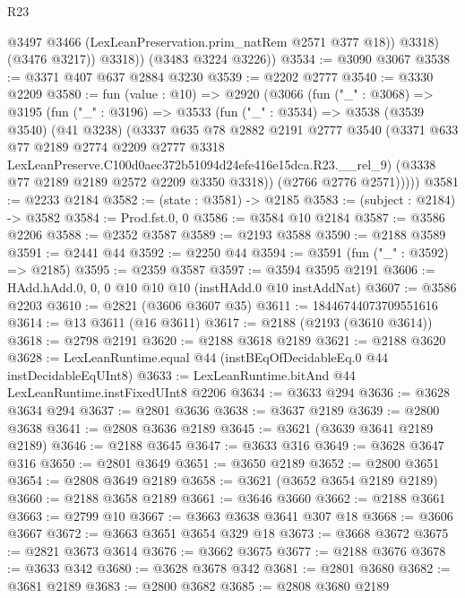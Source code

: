 \begin{lexlean}{R23}
\begin{coremodule}
                @3497
                @3466
                (LexLeanPreservation.prim_natRem @2571 @377 @18))
              @3318)
            (@3476 @3217))
          @3318))
      (@3483 @3224 @3226))
@3534 := @3090 @3067
@3538 := @3371 @407 @637 @2884 @3230
@3539 := @2202 @2777
@3540 := @3330 @2209
@3580 := fun (value : @10) =>
  @2920
    (@3066
      (fun ("_" : @3068) =>
      @3195
        (fun ("_" : @3196) =>
        @3533
          (fun ("_" : @3534) =>
          @3538
            (@3539 @3540)
            (@41 @3238)
            (@3337
              @635
              @78
              @2882
              @2191
              @2777
              @3540
              (@3371
                @633
                @77
                @2189
                @2774
                @2209
                @2777
                @3318
                LexLeanPreserve.C100d0aec372b51094d24efe416e15dca.R23.__rel_9)
              (@3338 @77 @2189 @2189 @2572 @2209 @3350 @3318))
            (@2766 @2776 @2571)))))
@3581 := @2233 @2184
@3582 := (state : @3581) -> @2185
@3583 := (subject : @2184) -> @3582
@3584 := Prod.fst.{0, 0}
@3586 := @3584 @10 @2184
@3587 := @3586 @2206
@3588 := @2352 @3587
@3589 := @2193 @3588
@3590 := @2188 @3589
@3591 := @2441 @44
@3592 := @2250 @44
@3594 := @3591 (fun ("_" : @3592) => @2185)
@3595 := @2359 @3587
@3597 := @3594 @3595 @2191
@3606 := HAdd.hAdd.{0, 0, 0} @10 @10 @10 (instHAdd.{0} @10 instAddNat)
@3607 := @3586 @2203
@3610 := @2821 (@3606 @3607 @35)
@3611 := 18446744073709551616
@3614 := @13 @3611 (@16 @3611)
@3617 := @2188 (@2193 (@3610 @3614))
@3618 := @2798 @2191
@3620 := @2188 @3618 @2189
@3621 := @2188 @3620
@3628 := LexLeanRuntime.equal @44 (instBEqOfDecidableEq.{0} @44 instDecidableEqUInt8)
@3633 := LexLeanRuntime.bitAnd @44 LexLeanRuntime.instFixedUInt8 @2206
@3634 := @3633 @294
@3636 := @3628 @3634 @294
@3637 := @2801 @3636
@3638 := @3637 @2189
@3639 := @2800 @3638
@3641 := @2808 @3636 @2189
@3645 := @3621 (@3639 @3641 @2189 @2189)
@3646 := @2188 @3645
@3647 := @3633 @316
@3649 := @3628 @3647 @316
@3650 := @2801 @3649
@3651 := @3650 @2189
@3652 := @2800 @3651
@3654 := @2808 @3649 @2189
@3658 := @3621 (@3652 @3654 @2189 @2189)
@3660 := @2188 @3658 @2189
@3661 := @3646 @3660
@3662 := @2188 @3661
@3663 := @2799 @10
@3667 := @3663 @3638 @3641 @307 @18
@3668 := @3606 @3667
@3672 := @3663 @3651 @3654 @329 @18
@3673 := @3668 @3672
@3675 := @2821 @3673 @3614
@3676 := @3662 @3675
@3677 := @2188 @3676
@3678 := @3633 @342
@3680 := @3628 @3678 @342
@3681 := @2801 @3680
@3682 := @3681 @2189
@3683 := @2800 @3682
@3685 := @2808 @3680 @2189

\end{coremodule}
\end{lexlean}
